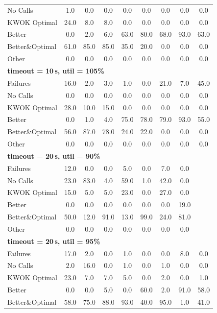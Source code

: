 \begin{tabular}{l cccccccc}
No Calls & 1.0 & 0.0 & 0.0 & 0.0 & 0.0 & 0.0 & 0.0 & 0.0 \\
KWOK Optimal & 24.0 & 8.0 & 8.0 & 0.0 & 0.0 & 0.0 & 0.0 & 0.0 \\
Better & 0.0 & 2.0 & 6.0 & 63.0 & 80.0 & 68.0 & 93.0 & 63.0 \\
Better\&Optimal & 61.0 & 85.0 & 85.0 & 35.0 & 20.0 & 0.0 & 0.0 & 0.0 \\
Other & 0.0 & 0.0 & 0.0 & 0.0 & 0.0 & 0.0 & 0.0 & 0.0 \\
\midrule
\multicolumn{9}{l}{\textbf{timeout = 10\,s, util = 105\%}} \\
\midrule
Failures & 16.0 & 2.0 & 3.0 & 1.0 & 0.0 & 21.0 & 7.0 & 45.0 \\
No Calls & 0.0 & 0.0 & 0.0 & 0.0 & 0.0 & 0.0 & 0.0 & 0.0 \\
KWOK Optimal & 28.0 & 10.0 & 15.0 & 0.0 & 0.0 & 0.0 & 0.0 & 0.0 \\
Better & 0.0 & 1.0 & 4.0 & 75.0 & 78.0 & 79.0 & 93.0 & 55.0 \\
Better\&Optimal & 56.0 & 87.0 & 78.0 & 24.0 & 22.0 & 0.0 & 0.0 & 0.0 \\
Other & 0.0 & 0.0 & 0.0 & 0.0 & 0.0 & 0.0 & 0.0 & 0.0 \\
\midrule
\multicolumn{9}{l}{\textbf{timeout = 20\,s, util = 90\%}} \\
\midrule
Failures & 12.0 & 0.0 & 0.0 & 5.0 & 0.0 & 7.0 & 0.0 & \text{--} \\
No Calls & 23.0 & 83.0 & 4.0 & 59.0 & 1.0 & 42.0 & 0.0 & \text{--} \\
KWOK Optimal & 15.0 & 5.0 & 5.0 & 23.0 & 0.0 & 27.0 & 0.0 & \text{--} \\
Better & 0.0 & 0.0 & 0.0 & 0.0 & 0.0 & 0.0 & 19.0 & \text{--} \\
Better\&Optimal & 50.0 & 12.0 & 91.0 & 13.0 & 99.0 & 24.0 & 81.0 & \text{--} \\
Other & 0.0 & 0.0 & 0.0 & 0.0 & 0.0 & 0.0 & 0.0 & \text{--} \\
\midrule
\multicolumn{9}{l}{\textbf{timeout = 20\,s, util = 95\%}} \\
\midrule
Failures & 17.0 & 2.0 & 0.0 & 1.0 & 0.0 & 0.0 & 8.0 & 0.0 \\
No Calls & 2.0 & 16.0 & 0.0 & 1.0 & 0.0 & 1.0 & 0.0 & 0.0 \\
KWOK Optimal & 23.0 & 7.0 & 7.0 & 5.0 & 0.0 & 2.0 & 0.0 & 1.0 \\
Better & 0.0 & 0.0 & 5.0 & 0.0 & 60.0 & 2.0 & 91.0 & 58.0 \\
Better\&Optimal & 58.0 & 75.0 & 88.0 & 93.0 & 40.0 & 95.0 & 1.0 & 41.0 \\

\end{tabular}
